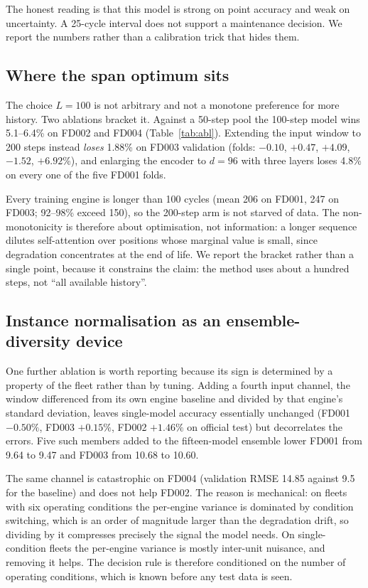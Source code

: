 \documentclass[journal,10pt]{IEEEtran}
\begin{document}
The honest reading is that this model is strong on point accuracy and weak on
uncertainty. A 25-cycle interval does not support a maintenance decision. We
report the numbers rather than a calibration trick that hides them.

\subsection{Where the span optimum sits}

The choice $L=100$ is not arbitrary and not a monotone preference for more
history. Two ablations bracket it. Against a 50-step pool the 100-step model
wins 5.1--6.4\% on FD002 and FD004 (Table~\ref{tab:abl}). Extending the input
window to 200 steps instead \emph{loses} 1.88\% on FD003 validation
(folds: $-0.10$, $+0.47$, $+4.09$, $-1.52$, $+6.92$\%), and enlarging the
encoder to $d=96$ with three layers loses 4.8\% on every one of the five FD001 folds.

Every training engine is longer than 100 cycles (mean 206 on FD001, 247 on
FD003; 92--98\% exceed 150), so the 200-step arm is not starved of data. The
non-monotonicity is therefore about optimisation, not information: a longer
sequence dilutes self-attention over positions whose marginal value is small,
since degradation concentrates at the end of life. We report the bracket rather
than a single point, because it constrains the claim: the method uses about a
hundred steps, not ``all available history''.

\subsection{Instance normalisation as an ensemble-diversity device}

One further ablation is worth reporting because its sign is determined by a
property of the fleet rather than by tuning. Adding a fourth input channel,
the window differenced from its own engine baseline and divided by that
engine's standard deviation, leaves single-model accuracy essentially
unchanged (FD001 $-0.50\%$, FD003 $+0.15\%$, FD002 $+1.46\%$ on official
test) but decorrelates the errors. Five such members added to the fifteen-model
ensemble lower FD001 from 9.64 to 9.47 and FD003 from 10.68 to 10.60.

The same channel is catastrophic on FD004 (validation RMSE 14.85 against 9.5
for the baseline) and does not help FD002. The reason is mechanical: on fleets
with six operating conditions the per-engine variance is dominated by condition
switching, which is an order of magnitude larger than the degradation drift, so
dividing by it compresses precisely the signal the model needs. On
single-condition fleets the per-engine variance is mostly inter-unit nuisance,
and removing it helps. The decision rule is therefore conditioned on the number
of operating conditions, which is known before any test data is seen.
\end{document}

